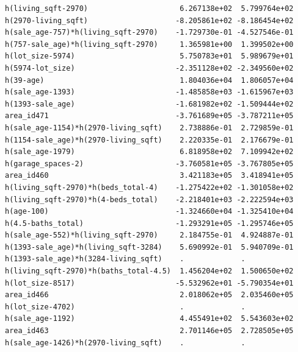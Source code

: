 \documentclass[
]{article}
\begin{document}
\begin{verbatim}
h(living_sqft-2970)                     6.267138e+02  5.799764e+02
h(2970-living_sqft)                    -8.205861e+02 -8.186454e+02
h(sale_age-757)*h(living_sqft-2970)    -1.729730e-01 -4.527546e-01
h(757-sale_age)*h(living_sqft-2970)     1.365981e+00  1.399502e+00
h(lot_size-5974)                        5.750783e+01  5.989679e+01
h(5974-lot_size)                       -2.351128e+02 -2.349560e+02
h(39-age)                               1.804036e+04  1.806057e+04
h(sale_age-1393)                       -1.485858e+03 -1.615967e+03
h(1393-sale_age)                       -1.681982e+02 -1.509444e+02
area_id471                             -3.761689e+05 -3.787211e+05
h(sale_age-1154)*h(2970-living_sqft)    2.738886e-01  2.729859e-01
h(1154-sale_age)*h(2970-living_sqft)    2.220335e-01  2.176679e-01
h(sale_age-1979)                        6.818958e+02  7.109942e+02
h(garage_spaces-2)                     -3.760581e+05 -3.767805e+05
area_id460                              3.421183e+05  3.418941e+05
h(living_sqft-2970)*h(beds_total-4)    -1.275422e+02 -1.301058e+02
h(living_sqft-2970)*h(4-beds_total)    -2.218401e+03 -2.222594e+03
h(age-100)                             -1.324660e+04 -1.325410e+04
h(4.5-baths_total)                     -1.293291e+05 -1.295746e+05
h(sale_age-552)*h(living_sqft-2970)     2.184755e-01  4.924887e-01
h(1393-sale_age)*h(living_sqft-3284)    5.690992e-01  5.940709e-01
h(1393-sale_age)*h(3284-living_sqft)    .             .           
h(living_sqft-2970)*h(baths_total-4.5)  1.456204e+02  1.500650e+02
h(lot_size-8517)                       -5.532962e+01 -5.790354e+01
area_id466                              2.018062e+05  2.035460e+05
h(lot_size-4702)                        .             .           
h(sale_age-1192)                        4.455491e+02  5.543603e+02
area_id463                              2.701146e+05  2.728505e+05
h(sale_age-1426)*h(2970-living_sqft)    .             .           
                                                                  

\end{verbatim}
\end{document}
